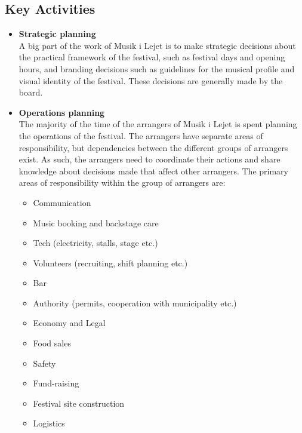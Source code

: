 \subsection{Key Activities} %
\label{sub:key_activities}
\begin{itemize}
	\item \textbf{Strategic planning}\\
	A big part of the work of Musik i Lejet is to make strategic decisions about the practical framework of the festival, such as festival days and opening hours, and branding decisions such as guidelines for the musical profile and visual identity of the festival. These decisions are generally made by the board.
	\item \textbf{Operations planning}\\
	The majority of the time of the arrangers of Musik i Lejet is spent planning the operations of the festival. The arrangers have separate areas of responsibility, but dependencies between the different groups of arrangers exist. As such, the arrangers need to coordinate their actions and share knowledge about decisions made that affect other arrangers. The primary areas of responsibility within the group of arrangers are:
	\begin{itemize}
		\item Communication
		\item Music booking and backstage care
		\item Tech (electricity, stalls, stage etc.)
		\item Volunteers (recruiting, shift planning etc.)
		\item Bar
		\item Authority (permits, cooperation with municipality etc.)
		\item Economy and Legal
		\item Food sales
		\item Safety
		\item Fund-raising
		\item Festival site construction
		\item Logistics
	\end{itemize}
\end{itemize}

